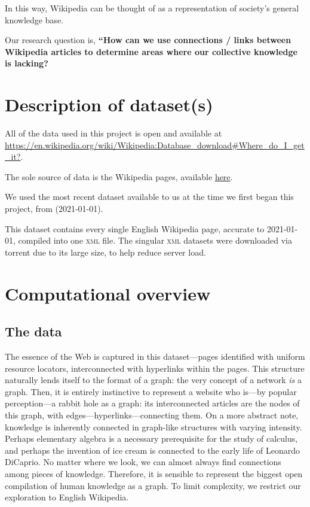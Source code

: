 \documentclass[fontsize=12pt]{article}
\begin{document}
\begin{multicols}{2}
    In this way, Wikipedia can be thought of as a representation of society's general knowledge base.
    
    Our research question is, \textbf{``How can we use connections / links between Wikipedia articles to determine areas where our collective knowledge is lacking?}
    
    \section{Description of dataset(s)}
    All of the data used in this project is open and available at \href{https://en.wikipedia.org/wiki/Wikipedia:Database\_download\#Where\_do\_I\_get\_it?}{https://en.wikipedia.org/wiki/Wikipedia:Database\_download\#Where\_do\_I\_get\_it?}. \parencite{WikimediaDownloads}
    
    The sole source of data is the Wikipedia pages, available \href{https://meta.wikimedia.org/wiki/Data\_dump\_torrents\#English\_Wikipedia}{here}. \parencite{DataDumpTorrents}
    
    We used the most recent dataset available to us at the time we first began this project, from (2021-01-01).
    
    This dataset contains every single English Wikipedia page, accurate to 2021-01-01, compiled into one \textsc{xml} file. The singular \textsc{xml} datasets were downloaded via torrent due to its large size, to help reduce server load.
    
    \section{Computational overview}
    \subsection{The data}
    The essence of the Web is captured in this dataset---pages identified with uniform resource locators, interconnected with hyperlinks within the pages. This structure naturally lends itself to the format of a graph: the very concept of a network \emph{is} a graph. Then, it is entirely instinctive to represent a website who is---by popular perception---a rabbit hole as a graph: its interconnected articles are the nodes of this graph, with edges---hyperlinks---connecting them. 
    On a more abstract note, knowledge is inherently connected in graph-like structures with varying intensity. Perhaps elementary algebra is a necessary prerequisite for the study of calculus, and perhaps the invention of ice cream is connected to the early life of Leonardo DiCaprio. No matter where we look, we can almost always find connections among pieces of knowledge.
    Therefore, it is sensible to represent the biggest open compilation of human knowledge as a graph. To limit complexity, we restrict our exploration to English Wikipedia. 


\end{multicols}
\end{document}
